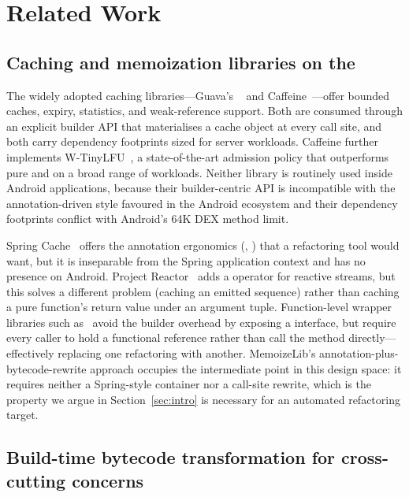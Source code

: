 \section{Related Work}\label{sec:rw}

\subsection{Caching and memoization libraries on the \jvm}

The widely adopted \jvm caching libraries---Guava's ~\cite{guava} and Caffeine~\cite{caffeine}---offer bounded caches, \ttl expiry, statistics, and weak-reference support. Both are consumed through an explicit builder API that materialises a cache object at every call site, and both carry dependency footprints sized for server workloads. Caffeine further implements W-TinyLFU~\cite{einziger2017tinylfu}, a state-of-the-art admission policy that outperforms pure \lru and \lfu on a broad range of workloads. Neither library is routinely used inside Android applications, because their builder-centric API is incompatible with the annotation-driven style favoured in the Android ecosystem and their dependency footprints conflict with Android's 64K DEX method limit.

Spring Cache~\cite{spring_cache} offers the annotation ergonomics (, ) that a refactoring tool would want, but it is inseparable from the Spring application context and has no presence on Android. Project Reactor~\cite{reactor_cache} adds a  operator for reactive streams, but this solves a different problem (caching an emitted sequence) rather than caching a pure function's return value under an argument tuple. Function-level wrapper libraries such as~\cite{javamemoization} avoid the builder overhead by exposing a  interface, but require every caller to hold a functional reference rather than call the method directly---effectively replacing one refactoring with another. MemoizeLib's annotation-plus-bytecode-rewrite approach occupies the intermediate point in this design space: it requires neither a Spring-style container nor a call-site rewrite, which is the property we argue in Section~\ref{sec:intro} is necessary for an automated refactoring target.

\subsection{Build-time bytecode transformation for cross-cutting concerns}

